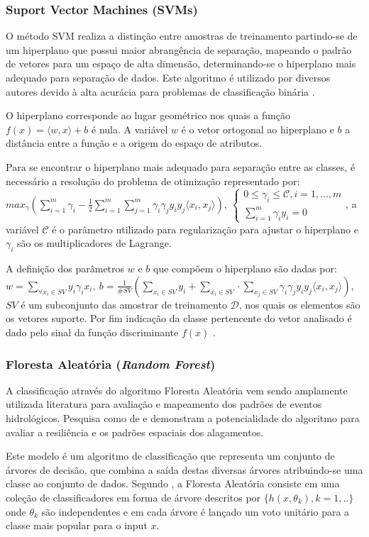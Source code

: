 \subsubsection{Suport Vector Machines (SVMs)}
O método SVM realiza a distinção entre amostras de treinamento partindo-se de um hiperplano que possui maior abrangência de separação, mapeando o padrão de vetores para um espaço de alta dimensão, determinando-se o hiperplano mais adequado para separação de dados. Este algoritmo é utilizado por diversos autores devido à alta acurácia para problemas de classificação binária \cite{lian2006multi} . 
\par O hiperplano corresponde ao lugar geométrico nos quais a função \(f(x)=\langle w,x \rangle+b\) é nula. A variável \(w\) é o vetor ortogonal ao hiperplano e \(b\) a distância entre a função e a origem do espaço de atributos. 
\par Para se encontrar o hiperplano mais adequado para separação entre as classes, é necessário a resolução do problema de otimização \cite{theodoridis2010introduction} representado por:
\(
    max_\gamma (\sum^m_{i=1} \gamma_i-\frac{1}{2}\sum^m_{i=1}\sum^m_{j=1}\gamma_i \gamma_j y_i y_j \langle x_i,x_j \rangle), \ 
    \begin{cases}
0 \leq \gamma_i \leq \mathcal{C}, i=1,...,m \\
    \sum^m_{i=1} \gamma_i y_i=0
\end{cases}
\), 
a variável \(\mathcal{C}\) é o parâmetro utilizado para regularização para ajustar o hiperplano e \(\gamma_i\) são os multiplicadores de Lagrange. 
\par A definição dos parâmetros \(w\) e \(b\) que compõem o hiperplano são dadas por: 
\(
    w=\sum_{\forall x_i \in SV}y_i \gamma_i x_i, \  
    b=\frac{1}{\#SV}(\sum_{x_i \in SV} y_i+ \sum_{x_i \in SV} \cdot \sum_{x_j \in SV} \gamma_i \gamma_j y_i y_j \langle x_i,x_j \rangle) 
\), \(SV\) é um subconjunto das amostrar de treinamento \(\mathcal{D}\), nos quais os elementos são os vetores suporte. Por fim indicação da classe pertencente do vetor analisado é dado pelo sinal da função discriminante \(f(x)\) \cite{maselli2019integraccao}.

\subsubsection{Floresta Aleatória (\textit{Random Forest})}
A classificação através do algoritmo Floresta Aleatória vem sendo amplamente utilizada literatura para avaliação e mapeamento dos padrões de eventos hidrológicos. Pesquisa como de \cite{zhu2021flood} e \cite{liu2020random} demonstram a potencialidade do algoritmo para avaliar a resiliência e os padrões espaciais dos alagamentos. 
\par Este modelo é um algoritmo de classificação que representa um conjunto de árvores de decisão, que combina a saída destas diversas árvores atribuindo-se uma classe ao conjunto de dados. Segundo \cite{breiman2001random}, a Floresta Aleatória consiste em uma coleção de classificadores em forma de árvore descritos por \(\{h(x,\theta_k), k=1,..\}\) onde \(\theta_k\) são independentes e em cada árvore é lançado um voto unitário para a classe mais popular para o input \(x\). 

